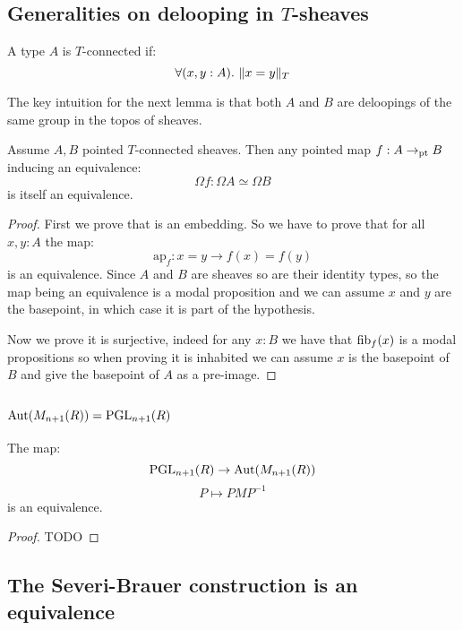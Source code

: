 \subsection{Generalities on delooping in $T$-sheaves}

\begin{definition}
A type $A$ is $T$-connected if:
\[\forall(x,y:A).\ \propTrunc{x=y}_T\]
\end{definition}

The key intuition for the next lemma is that both $A$ and $B$ are deloopings of the same group in the topos of sheaves.

\begin{lemma}
Assume $A,B$ pointed $T$-connected sheaves. Then any pointed map $f:A\to_{\mathrm{pt}} B$ inducing an equivalence:
\[\Omega f : \Omega A \simeq \Omega B\]
is itself an equivalence.
\end{lemma}

\begin{proof}
First we prove that is an embedding. So we have to prove that for all $x,y:A$ the map:
\[\mathrm{ap}_f : x=y \to f(x)=f(y)\]
is an equivalence. Since $A$ and $B$ are sheaves so are their identity types, so the map being an equivalence is a modal proposition and we can assume $x$ and $y$ are the basepoint, in which case it is part of the hypothesis.

Now we prove it is surjective, indeed for any $x:B$ we have that $\mathrm{fib}_f(x)$ is a modal propositions so when proving it is inhabited we can assume $x$ is the basepoint of $B$ and give the basepoint of $A$ as a pre-image.
\end{proof}


\subsection{$\mathrm{Aut}(M_{n+1}(R)) = \operatorname{PGL}_{n+1}(R)$}

\begin{proposition}
The map:
\[\operatorname{PGL}_{n+1}(R)\to\mathrm{Aut}(M_{n+1}(R))\]
\[P\mapsto PMP^{-1}\]
is an equivalence.
\end{proposition}

\begin{proof}
TODO
\end{proof}


\subsection{The Severi-Brauer construction is an equivalence}

